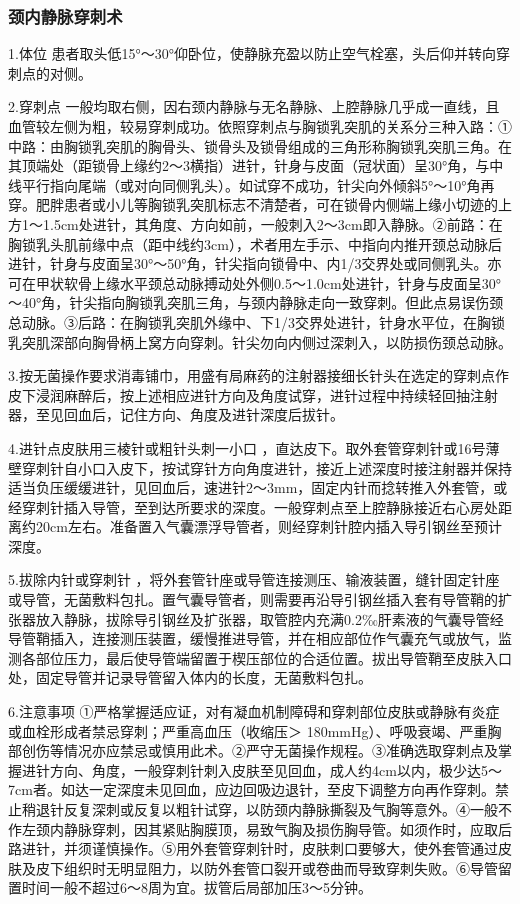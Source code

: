 \subsubsection{颈内静脉穿刺术}

1.体位
患者取头低15°～30°仰卧位，使静脉充盈以防止空气栓塞，头后仰并转向穿刺点的对侧。

2.穿刺点
一般均取右侧，因右颈内静脉与无名静脉、上腔静脉几乎成一直线，且血管较左侧为粗，较易穿刺成功。依照穿刺点与胸锁乳突肌的关系分三种入路：①中路：由胸锁乳突肌的胸骨头、锁骨头及锁骨组成的三角形称胸锁乳突肌三角。在其顶端处（距锁骨上缘约2～3横指）进针，针身与皮面（冠状面）呈30°角，与中线平行指向尾端（或对向同侧乳头）。如试穿不成功，针尖向外倾斜5°～10°角再穿。肥胖患者或小儿等胸锁乳突肌标志不清楚者，可在锁骨内侧端上缘小切迹的上方1～1.5cm处进针，其角度、方向如前，一般刺入2～3cm即入静脉。②前路：在胸锁乳头肌前缘中点（距中线约3cm），术者用左手示、中指向内推开颈总动脉后进针，针身与皮面呈30°～50°角，针尖指向锁骨中、内1/3交界处或同侧乳头。亦可在甲状软骨上缘水平颈总动脉搏动处外侧0.5～1.0cm处进针，针身与皮面呈30°～40°角，针尖指向胸锁乳突肌三角，与颈内静脉走向一致穿刺。但此点易误伤颈总动脉。③后路：在胸锁乳突肌外缘中、下1/3交界处进针，针身水平位，在胸锁乳突肌深部向胸骨柄上窝方向穿刺。针尖勿向内侧过深刺入，以防损伤颈总动脉。

3.按无菌操作要求消毒铺巾，用盛有局麻药的注射器接细长针头在选定的穿刺点作皮下浸润麻醉后，按上述相应进针方向及角度试穿，进针过程中持续轻回抽注射器，至见回血后，记住方向、角度及进针深度后拔针。

4.进针点皮肤用三棱针或粗针头刺一小口
，直达皮下。取外套管穿刺针或16号薄壁穿刺针自小口入皮下，按试穿针方向角度进针，接近上述深度时接注射器并保持适当负压缓缓进针，见回血后，速进针2～3mm，固定内针而捻转推入外套管，或经穿刺针插入导管，至到达所要求的深度。一般穿刺点至上腔静脉接近右心房处距离约20cm左右。准备置入气囊漂浮导管者，则经穿刺针腔内插入导引钢丝至预计深度。

5.拔除内针或穿刺针
，将外套管针座或导管连接测压、输液装置，缝针固定针座或导管，无菌敷料包扎。置气囊导管者，则需要再沿导引钢丝插入套有导管鞘的扩张器放入静脉，拔除导引钢丝及扩张器，取管腔内充满0.2‰肝素液的气囊导管经导管鞘插入，连接测压装置，缓慢推进导管，并在相应部位作气囊充气或放气，监测各部位压力，最后使导管端留置于楔压部位的合适位置。拔出导管鞘至皮肤入口处，固定导管并记录导管留入体内的长度，无菌敷料包扎。

6.注意事项
①严格掌握适应证，对有凝血机制障碍和穿刺部位皮肤或静脉有炎症或血栓形成者禁忌穿刺；严重高血压（收缩压＞
180mmHg）、呼吸衰竭、严重胸部创伤等情况亦应禁忌或慎用此术。②严守无菌操作规程。③准确选取穿刺点及掌握进针方向、角度，一般穿刺针刺入皮肤至见回血，成人约4cm以内，极少达5～7cm者。如达一定深度未见回血，应边回吸边退针，至皮下调整方向再作穿刺。禁止稍退针反复深刺或反复以粗针试穿，以防颈内静脉撕裂及气胸等意外。④一般不作左颈内静脉穿刺，因其紧贴胸膜顶，易致气胸及损伤胸导管。如须作时，应取后路进针，并须谨慎操作。⑤用外套管穿刺针时，皮肤刺口要够大，使外套管通过皮肤及皮下组织时无明显阻力，以防外套管口裂开或卷曲而导致穿刺失败。⑥导管留置时间一般不超过6～8周为宜。拔管后局部加压3～5分钟。

